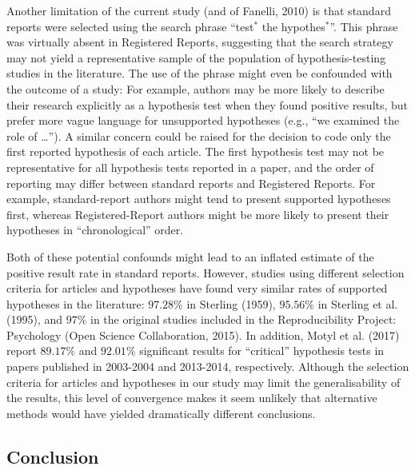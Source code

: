 \documentclass[british,,jou,floatsintext]{apa6}
\begin{document}
Another limitation of the current study (and of Fanelli, 2010) is that standard reports were selected using the search phrase \enquote{test\(^\ast\) the hypothes\(^\ast\)}.
This phrase was virtually absent in Registered Reports, suggesting that the search strategy may not yield a representative sample of the population of hypothesis-testing studies in the literature.
The use of the phrase might even be confounded with the outcome of a study:
For example, authors may be more likely to describe their research explicitly as a hypothesis test when they found positive results, but prefer more vague language for unsupported hypotheses (e.g., \enquote{we examined the role of \ldots{}}).
A similar concern could be raised for the decision to code only the first reported hypothesis of each article.
The first hypothesis test may not be representative for all hypothesis tests reported in a paper, and the order of reporting may differ between standard reports and Registered Reports.
For example, standard-report authors might tend to present supported hypotheses first, whereas Registered-Report authors might be more likely to present their hypotheses in \enquote{chronological} order.

Both of these potential confounds might lead to an inflated estimate of the positive result rate in standard reports.
However, studies using different selection criteria for articles and hypotheses have found very similar rates of supported hypotheses in the literature:
\(97.28\%\) in Sterling (1959), \(95.56\%\) in Sterling et al. (1995), and \(97\%\) in the original studies included in the Reproducibility Project: Psychology (Open Science Collaboration, 2015).
In addition, Motyl et al. (2017) report \(89.17\%\) and \(92.01\%\) significant results for \enquote{critical} hypothesis tests in papers published in 2003-2004 and 2013-2014, respectively.
Although the selection criteria for articles and hypotheses in our study may limit the generalisability of the results, this level of convergence makes it seem unlikely that alternative methods would have yielded dramatically different conclusions.

\hypertarget{conclusion}{%
\subsection{Conclusion}\label{conclusion}}
\end{document}
